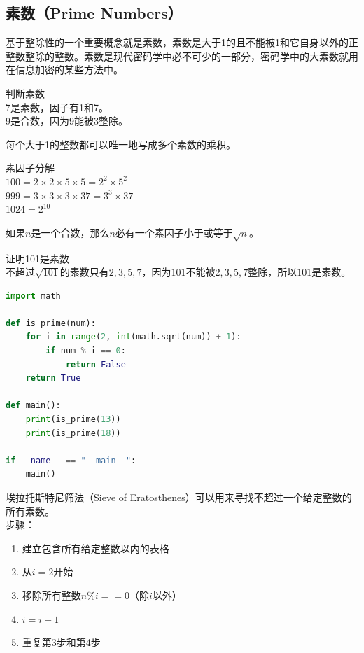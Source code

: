 \documentclass[12pt, openany, oneside]{book}
\begin{document}
\subsection{素数（Prime Numbers）}

基于整除性的一个重要概念就是素数，素数是大于1的且不能被1和它自身以外的正整数整除的整数。素数是现代密码学中必不可少的一部分，密码学中的大素数就用在信息加密的某些方法中。

\begin{tcolorbox}
	判断素数 \\
	7是素数，因子有1和7。 \\
	9是合数，因为9能被3整除。
\end{tcolorbox}

每个大于1的整数都可以唯一地写成多个素数的乘积。

\begin{tcolorbox}
	素因子分解 \\
	$ 100 = 2 \times 2 \times 5 \times 5 = 2^2 \times 5^2 $ \\
	$ 999 = 3 \times 3 \times 3 \times 37 = 3^3 \times 37 $ \\
	$ 1024 = 2^{10} $
\end{tcolorbox}

如果$ n $是一个合数，那么$ n $必有一个素因子小于或等于$ \sqrt{n} $。

\begin{tcolorbox}
	证明101是素数 \\
	不超过$ \sqrt{101} $的素数只有$ 2, 3, 5, 7 $，因为$ 101 $不能被$ 2, 3, 5, 7 $整除，所以$ 101 $是素数。
\end{tcolorbox}

\vspace{-0.5cm}
\begin{lstlisting}[language=Python]
import math

def is_prime(num):
	for i in range(2, int(math.sqrt(num)) + 1):
		if num % i == 0:
			return False
	return True

def main():
	print(is_prime(13))
	print(is_prime(18))

if __name__ == "__main__":
	main()
\end{lstlisting}

埃拉托斯特尼筛法（Sieve of Eratosthenes）可以用来寻找不超过一个给定整数的所有素数。 \\

步骤：

\begin{enumerate}
	\item 建立包含所有给定整数以内的表格
	\item 从$ i = 2 $开始
	\item 移除所有整数$ n \% i == 0 $（除$ i $以外）
	\item $ i = i + 1 $
	\item 重复第3步和第4步
\end{enumerate}
\end{document}
